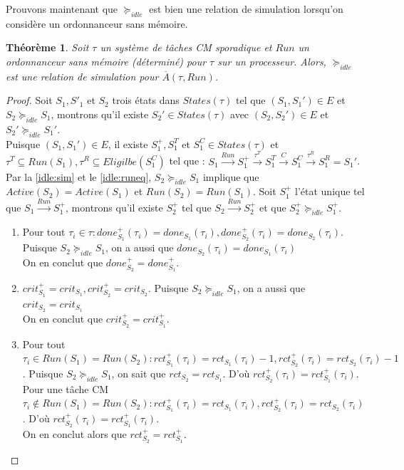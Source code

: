 \documentclass[12pt,a4paper,oneside]{book}
\theoremstyle{break}
\theoremstyle{breakplain}
\newtheorem{theo}{Théorème}[chapter]
\begin{document}
Prouvons maintenant que $\succeq_{idle}$ est bien une relation de simulation lorsqu'on considère un ordonnanceur sans mémoire.\\

\begin{theo}
Soit $\tau$ un système de tâches CM sporadique et $Run$ un ordonnanceur sans mémoire (déterminé) pour $\tau$ sur un processeur. Alors, $\succeq_{idle}$ est une relation de simulation pour $\overline{A}(\tau, Run)$.
\end{theo}

\begin{proof}
Soit $S_1, S'_1$ et $S_2$ trois états dans $States(\tau)$ tel que $(S_1, S_1') \in E$ et $S_2 \succeq_{idle}S_1$, montrons qu'il existe $S_2' \in States(\tau)$ avec $(S_2, S_2') \in E$ et $S_2' \succeq_{idle} S_1'$.\\

Puisque $(S_1, S_1') \in E$, il existe $S^{+}_1, S^{T}_1$ et $S^{C}_1 \in States(\tau)$ et $\tau^T \subseteq Run(S_1),\tau^R \subseteq Eligilbe(S^{C}_1) $ tel que : $S_1\xrightarrow{Run}S^{+}_1\xrightarrow{\tau^T}S^{T}_1\xrightarrow{C}S^{C}_1\xrightarrow{\tau^R}S_1^R=S_1'$.\\

Par la \autoref{idle:sim} et le \autoref{idle:runeq}, $S_2 \succeq_{idle} S_1$ implique que $Active(S_2) = Active(S_1)$ et $Run(S_2) = Run(S_1)$. Soit $S^+_1$ l'état unique tel que $S_1\xrightarrow{Run}S^{+}_1$, montrons qu'il existe $S^+_2$ tel que $S_2\xrightarrow{Run}S^{+}_2$ et que $S^+_2 \succeq_{idle} S^+_1$.
\begin{enumerate}

\item \label{idle:exe:done} Pour tout  $\tau_i \in \tau : done_{S_1}^+(\tau_i) = done_{S_1}(\tau_i), done_{S_2}^+(\tau_i) = done_{S_2}(\tau_i)$. Puisque $S_2 \succeq_{idle} S_1$, on a aussi que $done_{S_2}(\tau_i) = done_{S_1}(\tau_i)$\\
On en conclut que $done_{S_2}^+ = done_{S_1}^+$.

\item $crit_{S_1}^+ = crit_{S_1}, crit_{S_2}^+ = crit_{S_2}$. Puisque $S_2 \succeq_{idle} S_1$, on a aussi que $crit_{S_2} = crit_{S_1}$\\
On en conclut que $crit_{S_2}^+ = crit_{S_1}^+$.

\item Pour tout $\tau_i \in Run(S_1) = Run(S_2) : rct_{S_1}^+(\tau_i) = rct_{S_1}(\tau_i) -1, rct_{S_2}^+(\tau_i) = rct_{S_2}(\tau_i) -1$. Puisque $S_2 \succeq_{idle} S_1$, on sait que $rct_{S_2} = rct_{S_1}$. D'où $rct_{S_2}^+(\tau_i) = rct_{S_1}^+(\tau_i)$.\\
Pour une tâche CM $\tau_i \notin Run(S_1) = Run(S_2) : rct_{S_1}^+(\tau_i) = rct_{S_1}(\tau_i), rct_{S_2}^+(\tau_i) = rct_{S_2}(\tau_i)$. D'où $rct_{S_2}^+(\tau_i) = rct_{S_1}^+(\tau_i)$.\\
On en conclut alors que $rct_{S_2}^+ = rct_{S_1}^+$.


\end{enumerate}
\end{proof}
\end{document}
